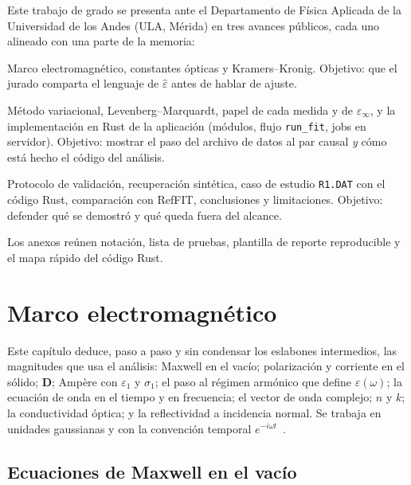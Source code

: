 Este trabajo de grado se presenta ante el Departamento de F\'isica Aplicada de la Universidad de los Andes (ULA, M\'erida) en tres avances p\'ublicos, cada uno alineado con una parte de la memoria:

\begin{description}[leftmargin=1.2cm,style=nextline]
\item[Seminario~I (Parte~I).]
Marco electromagn\'etico, constantes \'opticas y Kramers--Kronig. Objetivo: que el jurado comparta el lenguaje de $\hat\varepsilon$ antes de hablar de ajuste.
\item[Seminario~II (Parte~II).]
M\'etodo variacional, Levenberg--Marquardt, papel de cada medida y de $\varepsilon_\infty$, y la implementaci\'on en Rust de la aplicaci\'on (m\'odulos, flujo \texttt{run\_fit}, jobs en servidor). Objetivo: mostrar el paso del archivo de datos al par causal \emph{y} c\'omo est\'a hecho el c\'odigo del an\'alisis.
\item[Seminario~III (Parte~III, defensa final).]
Protocolo de validaci\'on, recuperaci\'on sint\'etica, caso de estudio \texttt{R1.DAT} con el c\'odigo Rust, comparaci\'on con RefFIT, conclusiones y limitaciones. Objetivo: defender qu\'e se demostr\'o y qu\'e queda fuera del alcance.
\end{description}

Los anexos re\'unen notaci\'on, lista de pruebas, plantilla de reporte reproducible y el mapa r\'apido del c\'odigo Rust.


\chapter{Marco electromagn\'etico}
\label{ch:marco}

Este cap\'itulo deduce, paso a paso y sin condensar los eslabones intermedios, las magnitudes que usa el an\'alisis:
Maxwell en el vac\'io; polarizaci\'on y corriente en el s\'olido; $\mathbf{D}$; Amp\`ere con $\varepsilon_1$ y $\sigma_1$;
el paso al r\'egimen arm\'onico que define $\hat\varepsilon(\omega)$; la ecuaci\'on de onda en el tiempo y en frecuencia;
el vector de onda complejo; $n$ y $k$; la conductividad \'optica; y la reflectividad a incidencia normal.
Se trabaja en unidades gaussianas y con la convenci\'on temporal $e^{-i\omega t}$~\cite{Jackson,electrodynamics}.

\section{Ecuaciones de Maxwell en el vac\'io}

